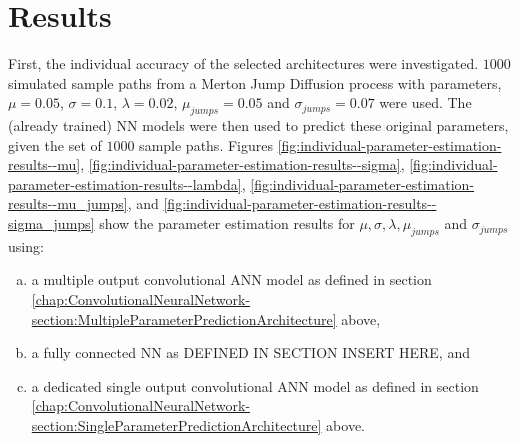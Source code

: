 \documentclass[11pt,oneside,openany,a4paper,english, report, goldenblock
]{usthesis}
\begin{document}
\chapter{Results}
\label{chapter:results}

First, the individual accuracy of the selected architectures were investigated. $1000$ simulated sample paths from a Merton Jump Diffusion process with parameters, $\mu = 0.05$, $\sigma = 0.1$, $\lambda = 0.02$, $\mu_{jumps} = 0.05$ and $\sigma_{jumps} = 0.07$ were used. The (already trained) NN models were then used to predict these original parameters, given the set of $1000$ sample paths. Figures \ref{fig:individual-parameter-estimation-results--mu}, \ref{fig:individual-parameter-estimation-results--sigma}, \ref{fig:individual-parameter-estimation-results--lambda}, \ref{fig:individual-parameter-estimation-results--mu_jumps}, and \ref{fig:individual-parameter-estimation-results--sigma_jumps} show the parameter estimation results for $\mu, \sigma, \lambda, \mu_{jumps}$ and $\sigma_{jumps}$ using: 

\begin{enumerate}[a)]
	\itemsep0em 
	\item  a multiple output convolutional ANN model as defined in section \ref{chap:ConvolutionalNeuralNetwork-section:MultipleParameterPredictionArchitecture} above,
	\item  a fully connected NN as DEFINED IN SECTION INSERT HERE, and
	\item  a dedicated single output convolutional ANN model as defined in section \ref{chap:ConvolutionalNeuralNetwork-section:SingleParameterPredictionArchitecture} above.
\end{enumerate}
\end{document}
